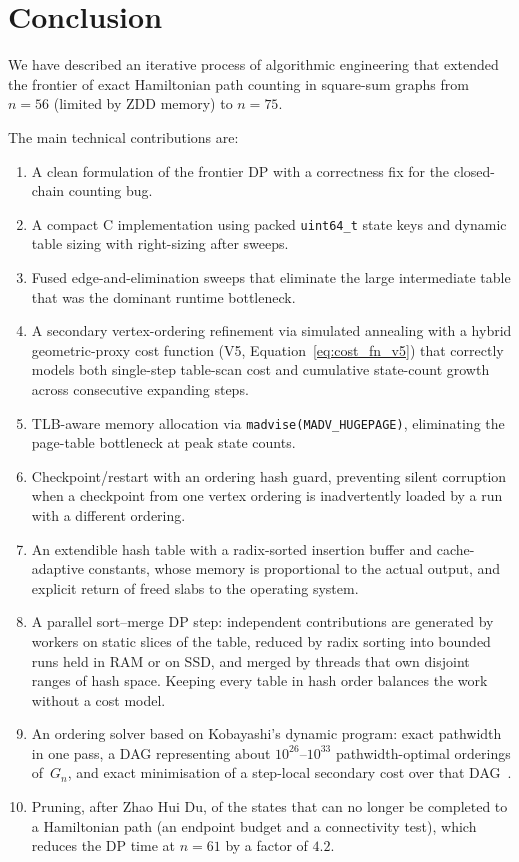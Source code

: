\documentclass[12pt]{article}
\theoremstyle{definition}
\newcommand{\Gn}{G_n}
\begin{document}
\section{Conclusion}
\label{sec:conclusion}

We have described an iterative process of algorithmic engineering that extended
the frontier of exact Hamiltonian path counting in square-sum graphs from
$n = 56$ (limited by ZDD memory) to $n = 75$.

The main technical contributions are:
\begin{enumerate}[nosep]
  \item A clean formulation of the frontier DP with a correctness fix for the
        closed-chain counting bug.
  \item A compact C implementation using packed \texttt{uint64\_t} state keys
        and dynamic table sizing with right-sizing after sweeps.
  \item Fused edge-and-elimination sweeps that eliminate the large intermediate
        table that was the dominant runtime bottleneck.
  \item A secondary vertex-ordering refinement via simulated annealing with a
        hybrid geometric-proxy cost function (V5, Equation~\ref{eq:cost_fn_v5})
        that correctly models both single-step table-scan cost and cumulative
        state-count growth across consecutive expanding steps.
  \item TLB-aware memory allocation via \texttt{madvise(MADV\_HUGEPAGE)},
        eliminating the page-table bottleneck at peak state counts.
  \item Checkpoint/restart with an ordering hash guard, preventing silent
        corruption when a checkpoint from one vertex ordering is inadvertently
        loaded by a run with a different ordering.
  \item An extendible hash table with a radix-sorted insertion buffer and
        cache-adaptive constants, whose memory is proportional to the actual
        output, and explicit return of freed slabs to the operating system.
  \item A parallel sort--merge DP step: independent contributions are
        generated by workers on static slices of the table, reduced by radix
        sorting into bounded runs held in RAM or on SSD, and merged by threads
        that own disjoint ranges of hash space.
        Keeping every table in hash order balances the work without a cost
        model.
  \item An ordering solver based on Kobayashi's dynamic program: exact
        pathwidth in one pass, a DAG representing about $10^{26}$--$10^{33}$
        pathwidth-optimal orderings of~$\Gn$, and exact minimisation of a
        step-local secondary cost over that DAG~\cite{MillerPathwidth}.
  \item Pruning, after Zhao Hui Du, of the states that can no longer be
        completed to a Hamiltonian path (an endpoint budget and a
        connectivity test), which reduces the DP time at $n=61$ by a
        factor of $4.2$.
\end{enumerate}
\end{document}
